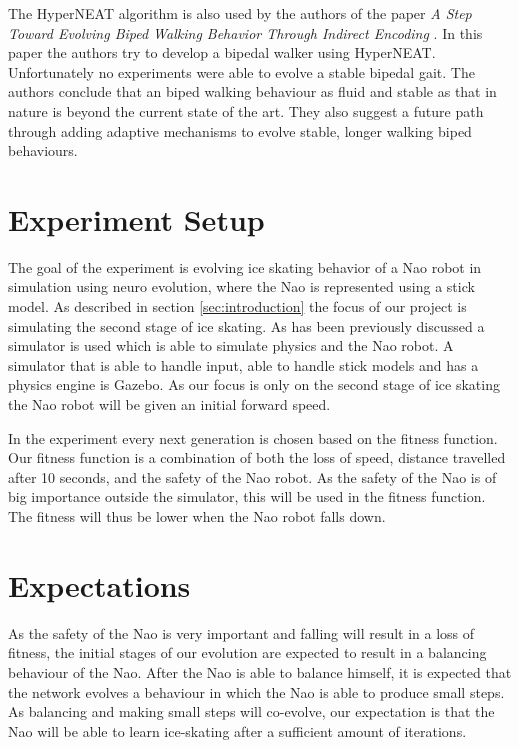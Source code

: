 \documentclass[10pt]{article}
\begin{document}
The HyperNEAT algorithm is also used by the authors of the paper \emph{A Step Toward Evolving Biped Walking Behavior Through Indirect Encoding} \cite{steptowardevolvingbipedwalkingbehavior}. In this paper the authors try to develop a bipedal walker using HyperNEAT. Unfortunately no experiments were able to evolve a stable bipedal gait. The authors conclude that an biped walking behaviour as fluid and stable as that in nature is beyond the current state of the art. They also suggest a future path through adding adaptive mechanisms to evolve stable, longer walking biped behaviours. 

\section{Experiment Setup}
The goal of the experiment is evolving ice skating behavior of a Nao robot in simulation using neuro evolution, where the Nao is represented using a stick model. As described in section \ref{sec:introduction} the focus of our project is simulating the second stage of ice skating. As has been previously discussed a simulator is used which is able to simulate physics and the Nao robot. A simulator that is able to handle input, able to handle stick models and has a physics engine is Gazebo. As our focus is only on the second stage of ice skating the Nao robot will be given an initial forward speed. 
  
In the experiment every next generation is chosen based on the fitness function. Our fitness function is a combination of both the loss of speed, distance travelled after 10 seconds, and the safety of the Nao robot. As the safety of the Nao is of big importance outside the simulator, this will be used in the fitness function. The fitness will thus be lower when the Nao robot falls down.  

\section{Expectations}
As the safety of the Nao is very important and falling will result in a loss of fitness, the initial stages of our evolution are expected to result in a balancing behaviour of the Nao. After the Nao is able to balance himself, it is expected that the network evolves a behaviour in which the Nao is able to produce small steps. As balancing and making small steps will co-evolve, our expectation is that the Nao will be able to learn ice-skating after a sufficient amount of iterations.  



\end{document}
